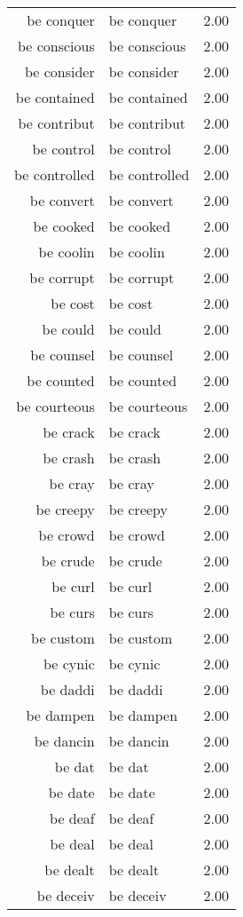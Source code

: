 \begin{table}[ht]
\begin{tabular}{rlr}
  be conquer & be conquer & 2.00 \\ 
  be conscious & be conscious & 2.00 \\ 
  be consider & be consider & 2.00 \\ 
  be contained & be contained & 2.00 \\ 
  be contribut & be contribut & 2.00 \\ 
  be control & be control & 2.00 \\ 
  be controlled & be controlled & 2.00 \\ 
  be convert & be convert & 2.00 \\ 
  be cooked & be cooked & 2.00 \\ 
  be coolin & be coolin & 2.00 \\ 
  be corrupt & be corrupt & 2.00 \\ 
  be cost & be cost & 2.00 \\ 
  be could & be could & 2.00 \\ 
  be counsel & be counsel & 2.00 \\ 
  be counted & be counted & 2.00 \\ 
  be courteous & be courteous & 2.00 \\ 
  be crack & be crack & 2.00 \\ 
  be crash & be crash & 2.00 \\ 
  be cray & be cray & 2.00 \\ 
  be creepy & be creepy & 2.00 \\ 
  be crowd & be crowd & 2.00 \\ 
  be crude & be crude & 2.00 \\ 
  be curl & be curl & 2.00 \\ 
  be curs & be curs & 2.00 \\ 
  be custom & be custom & 2.00 \\ 
  be cynic & be cynic & 2.00 \\ 
  be daddi & be daddi & 2.00 \\ 
  be dampen & be dampen & 2.00 \\ 
  be dancin & be dancin & 2.00 \\ 
  be dat & be dat & 2.00 \\ 
  be date & be date & 2.00 \\ 
  be deaf & be deaf & 2.00 \\ 
  be deal & be deal & 2.00 \\ 
  be dealt & be dealt & 2.00 \\ 
  be deceiv & be deceiv & 2.00 \\ 

\end{tabular}
\end{table}
